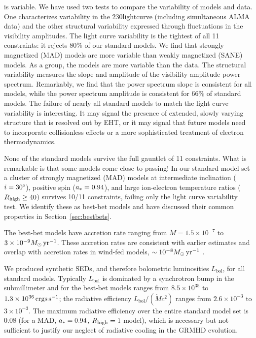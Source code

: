 \sgra is variable.  We have used two tests to compare the variability of models and data. One characterizes variability in the 230\GHz lightcurve (including simultaneous ALMA data) and the other structural variability expressed through fluctuations in the visibility amplitudes.  The light curve variability is the tightest of all 11 constraints: it rejects 80\% of our standard models.  We find that strongly magnetized (MAD) models are more variable than weakly magnetized (SANE) models.  As a group, the models are more variable than the data.  The structural variability measures the slope and amplitude of the visibility amplitude power spectrum.  Remarkably, we find that the power spectrum slope is consistent for all models, while the power spectrum amplitude is consistent for 66\% of standard models.  The failure of nearly all standard models to match the light curve variability is interesting.  It may signal the presence of extended, slowly varying structure that is resolved out by EHT, or it may signal that future models need to incorporate collisionless effects or a more sophisticated treatment of electron thermodynamics.

None of the standard models survive the full gauntlet of 11 constraints.  What is remarkable is that some models come close to passing!  In our standard model set a cluster of strongly magnetized (MAD) models at intermediate inclination ($i = 30\degree$), positive spin ($a_* = 0.94$), and large ion-electron temperature ratios ($R_\mathrm{high} \ge 40$) survives 10/11 constraints, failing only the light curve variability test.  We identify these as best-bet models and have discussed their common properties in Section~\ref{sec:bestbets}.

The best-bet models have accretion rate ranging from $\dot{M} = 1.5 \times 10^{-7}$ to $3 \times 10^{-9} M_\odot\,\mathrm{yr}^{-1}$.  These accretion rates are consistent with earlier estimates and overlap with accretion rates in wind-fed models, $\sim 10^{-8} M_\odot\,\mathrm{yr}^{-1}$ \citep{2020ApJ...896L...6R}.

We produced synthetic SEDs, and therefore bolometric luminosities $L_\mathrm{bol}$, for all standard models.  Typically $L_\mathrm{bol}$ is dominated by a synchrotron bump in the submillimeter and for the best-bet models ranges from $8.5\times10^{35}$ to $1.3\times10^{36}\,\mathrm{ergs\,s^{-1}}$; the radiative efficiency $L_\mathrm{bol}/(\dot{M} c^2)$ ranges from $2.6\times10^{-3}$ to $3\times10^{-3}$.  The maximum radiative efficiency over the entire standard model set is 0.08 (for a MAD, $a_* = 0.94$, $R_\mathrm{high} = 1$ model), which is necessary but not sufficient to justify our neglect of radiative cooling in the GRMHD evolution.

